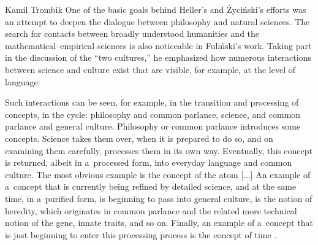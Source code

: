 \begin{artengenv}{Kamil Trombik}
One of the basic goals behind Heller's and Życiński's efforts was an attempt to deepen the dialogue between philosophy and natural sciences. The search for contacts between broadly understood humanities and the mathematical–empirical sciences is also noticeable in Fuliński's work. Taking part in the discussion of the ``two cultures,'' he emphasized how numerous interactions between science and culture exist that are visible, for example, at the level of language:



Such interactions can be seen, for example, in the transition and processing of concepts, in the cycle: philosophy and common parlance, science, and common parlance and general culture. Philosophy or common parlance introduces some concepts. Science takes them over, when it is prepared to do so, and on examining them carefully, processes them in its own way. Eventually, this concept is returned, albeit in a~processed form, into everyday language and common culture. The most obvious example is the concept of the atom [...] An example of a~concept that is currently being refined by detailed science, and at the same time, in a~purified form, is beginning to pass into general culture, is the notion of heredity, which originates in common parlance and the related more technical notion of the gene, innate traits, and so on. Finally, an example of a~concept that is just beginning to enter this processing process is the concept of time
\parencite[][p.22]{janik_fizyka_1981}.%





\end{artengenv}
